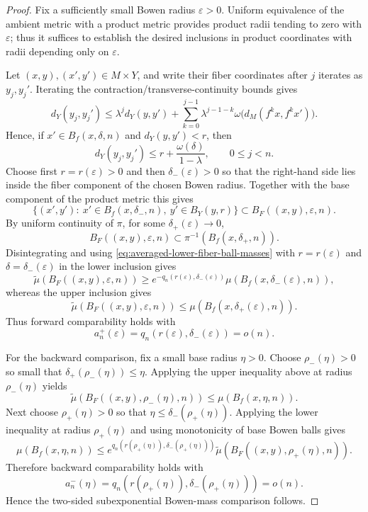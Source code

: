 \documentclass[11pt,a4paper]{article}
\newcommand{\eps}{\varepsilon}
\begin{document}
\begin{proof}
Fix a sufficiently small Bowen radius $\eps>0$. Uniform equivalence of the
ambient metric with a product metric provides product radii tending to zero
with $\eps$; thus it suffices to establish the desired inclusions in product
coordinates with radii depending only on $\eps$.

Let $(x,y),(x',y')\in M\times Y$, and write their fiber coordinates after $j$
iterates as $y_j,y_j'$. Iterating the contraction/transverse-continuity bounds
gives
\[
d_Y(y_j,y_j')
\le \lambda^j d_Y(y,y')
+\sum_{k=0}^{j-1}\lambda^{j-1-k}
\omega\bigl(d_M(f^kx,f^kx')\bigr).
\]
Hence, if $x'\in B_f(x,\delta,n)$ and $d_Y(y,y')<r$, then
\[
d_Y(y_j,y_j')
\le r+\frac{\omega(\delta)}{1-\lambda},
\qquad 0\le j<n.
\]
Choose first $r=r(\eps)>0$ and then $\delta_-(\eps)>0$ so that the right-hand
side lies inside the fiber component of the chosen Bowen radius. Together with
the base component of the product metric this gives
\begin{equation}
\label{eq:skew-product-lower-inclusion}
\bigl\{(x',y'):\ x'\in B_f(x,\delta_-,n),\
 y'\in B_Y(y,r)\bigr\}
\subset B_F((x,y),\eps,n).
\end{equation}
By uniform continuity of $\pi$, for some $\delta_+(\eps)\to0$,
\begin{equation}
\label{eq:skew-product-upper-inclusion}
B_F((x,y),\eps,n)
\subset \pi^{-1}(B_f(x,\delta_+,n)).
\end{equation}
Disintegrating and using
\eqref{eq:averaged-lower-fiber-ball-masses} with
$r=r(\eps)$ and $\delta=\delta_-(\eps)$ in the lower inclusion gives
\[
\widetilde\mu(B_F((x,y),\eps,n))
\ge e^{-q_n(r(\eps),\delta_-(\eps))}
\mu(B_f(x,\delta_-(\eps),n)),
\]
whereas the upper inclusion gives
\[
\widetilde\mu(B_F((x,y),\eps,n))
\le \mu(B_f(x,\delta_+(\eps),n)).
\]
Thus forward comparability holds with
\[
a_n^+(\eps)=q_n(r(\eps),\delta_-(\eps))=o(n).
\]

For the backward comparison, fix a small base radius $\eta>0$. Choose
$\rho_-(\eta)>0$ so small that
$\delta_+(\rho_-(\eta))\le\eta$. Applying the upper inequality above at radius
$\rho_-(\eta)$ yields
\[
\widetilde\mu(B_F((x,y),\rho_-(\eta),n))
\le \mu(B_f(x,\eta,n)).
\]
Next choose $\rho_+(\eta)>0$ so that
$\eta\le\delta_-(\rho_+(\eta))$. Applying the lower inequality at radius
$\rho_+(\eta)$ and using monotonicity of base Bowen balls gives
\[
\mu(B_f(x,\eta,n))
\le e^{q_n(r(\rho_+(\eta)),\delta_-(\rho_+(\eta)))}
\widetilde\mu(B_F((x,y),\rho_+(\eta),n)).
\]
Therefore backward comparability holds with
\[
a_n^-(\eta)
=q_n(r(\rho_+(\eta)),\delta_-(\rho_+(\eta)))=o(n).
\]
Hence the two-sided subexponential Bowen-mass comparison follows.
\end{proof}
\end{document}
